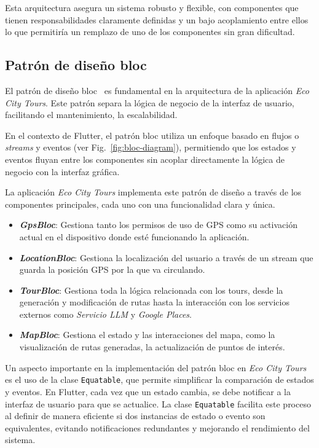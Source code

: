 Esta arquitectura asegura un sistema robusto y flexible, con componentes que tienen responsabilidades claramente definidas y un bajo acoplamiento entre ellos lo que permitiría un remplazo de uno de los componentes sin gran dificultad.


\subsection{Patrón de diseño \acrfull{bloc}}
El patrón de diseño \acrshort{bloc}~\cite{flutter_bloc} es fundamental en la arquitectura de la aplicación \textit{Eco City Tours}. Este patrón separa la lógica de negocio de la interfaz de usuario, facilitando el mantenimiento, la escalabilidad.

En el contexto de Flutter, el patrón \acrlong{bloc} utiliza un enfoque basado en flujos o \textit{streams} y eventos (ver Fig.~\ref{fig:bloc-diagram}), permitiendo que los estados y eventos fluyan entre los componentes sin acoplar directamente la lógica de negocio con la interfaz gráfica. 

La aplicación \textit{Eco City Tours} implementa este patrón de diseño a través de los componentes principales, cada uno con una funcionalidad clara y única.
\begin{itemize}
	\item \textbf{\textit{GpsBloc}}: Gestiona tanto los permisos de uso de GPS como su activación actual en el dispositivo donde esté funcionando la aplicación.
	\item \textbf{\textit{LocationBloc}}: Gestiona la localización del usuario a través de un stream que guarda la posición GPS por la que va circulando.
	\item \textbf{\textit{TourBloc}}: Gestiona toda la lógica relacionada con los tours, desde la generación y modificación de rutas hasta la interacción con los servicios externos como \textit{Servicio LLM} y \textit{Google Places}.
	\item \textbf{\textit{MapBloc}}: Gestiona el estado y las interacciones del mapa, como la visualización de rutas generadas, la actualización de puntos de interés.
\end{itemize}

Un aspecto importante en la implementación del patrón \acrshort{bloc} en \textit{Eco City Tours} es el uso de la clase \texttt{Equatable}, que permite simplificar la comparación de estados y eventos. En Flutter, cada vez que un estado cambia, se debe notificar a la interfaz de usuario para que se actualice. La clase \texttt{Equatable} facilita este proceso al definir de manera eficiente si dos instancias de estado o evento son equivalentes, evitando notificaciones redundantes y mejorando el rendimiento del sistema.

